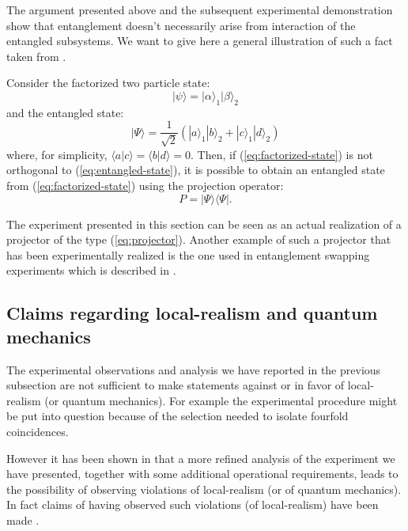 \begin{observation}
  The argument presented above and the subsequent experimental demonstration show that entanglement doesn't necessarily arise from interaction of the entangled subsystems. We want to give here a general illustration of such a fact taken from \cite{NYAS:NYAS91}.

Consider the factorized two particle state:
\begin{equation}
  |\psi\rangle = |\alpha\rangle_1 |\beta\rangle_2
  \label{eq:factorized-state}
\end{equation}
and the entangled state:
\begin{equation}
  |\Psi\rangle = \frac{1}{\sqrt{2}} \left( |a\rangle_1 |b\rangle_2 + |c\rangle_1 |d\rangle_2\right)
  \label{eq:entangled-state}
\end{equation}
where, for simplicity, $\langle a | c \rangle = \langle b | d \rangle = 0$.
Then, if (\ref{eq:factorized-state}) is not orthogonal to (\ref{eq:entangled-state}), it is possible to obtain an entangled state from (\ref{eq:factorized-state}) using the projection operator:
\begin{equation}
  P = |\Psi\rangle \langle\Psi|.
  \label{eq:projector}
\end{equation}

The experiment presented in this section can be seen as an actual realization of a projector of the type (\ref{eq:projector}). Another example of such a projector that has been experimentally realized is the one used in entanglement swapping experiments which is described in \cite{NYAS:NYAS91}.
\end{observation}



\subsection{Claims regarding local-realism and quantum mechanics}
The experimental observations and analysis we have reported in the previous subsection are not sufficient to make statements against or in favor of local-realism (or quantum mechanics). For example the experimental procedure might be put into question because of the selection needed to isolate fourfold coincidences.

However it has been shown in \cite{PhysRevA.61.022109} that a more refined analysis of the experiment we have presented, together with some additional operational requirements, leads to the possibility of observing violations of local-realism (or of quantum mechanics). In fact claims of having observed such violations (of local-realism) have been made \cite{Nature.403.515}.

